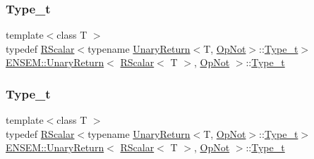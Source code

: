 \subsubsection{\texorpdfstring{Type\_t}{Type\_t}\hspace{0.1cm}{\footnotesize\ttfamily [1/3]}}
{\footnotesize\ttfamily template$<$class T $>$ \\
typedef \mbox{\hyperlink{classENSEM_1_1RScalar}{R\+Scalar}}$<$typename \mbox{\hyperlink{structENSEM_1_1UnaryReturn}{Unary\+Return}}$<$T, \mbox{\hyperlink{structENSEM_1_1OpNot}{Op\+Not}}$>$\+::\mbox{\hyperlink{structENSEM_1_1UnaryReturn_3_01RScalar_3_01T_01_4_00_01OpNot_01_4_af9f59bfbcb4e45c668599e7707d39a0c}{Type\+\_\+t}}$>$ \mbox{\hyperlink{structENSEM_1_1UnaryReturn}{E\+N\+S\+E\+M\+::\+Unary\+Return}}$<$ \mbox{\hyperlink{classENSEM_1_1RScalar}{R\+Scalar}}$<$ T $>$, \mbox{\hyperlink{structENSEM_1_1OpNot}{Op\+Not}} $>$\+::\mbox{\hyperlink{structENSEM_1_1UnaryReturn_3_01RScalar_3_01T_01_4_00_01OpNot_01_4_af9f59bfbcb4e45c668599e7707d39a0c}{Type\+\_\+t}}}

\mbox{\label{structENSEM_1_1UnaryReturn_3_01RScalar_3_01T_01_4_00_01OpNot_01_4_af9f59bfbcb4e45c668599e7707d39a0c}} 
\subsubsection{\texorpdfstring{Type\_t}{Type\_t}\hspace{0.1cm}{\footnotesize\ttfamily [2/3]}}
{\footnotesize\ttfamily template$<$class T $>$ \\
typedef \mbox{\hyperlink{classENSEM_1_1RScalar}{R\+Scalar}}$<$typename \mbox{\hyperlink{structENSEM_1_1UnaryReturn}{Unary\+Return}}$<$T, \mbox{\hyperlink{structENSEM_1_1OpNot}{Op\+Not}}$>$\+::\mbox{\hyperlink{structENSEM_1_1UnaryReturn_3_01RScalar_3_01T_01_4_00_01OpNot_01_4_af9f59bfbcb4e45c668599e7707d39a0c}{Type\+\_\+t}}$>$ \mbox{\hyperlink{structENSEM_1_1UnaryReturn}{E\+N\+S\+E\+M\+::\+Unary\+Return}}$<$ \mbox{\hyperlink{classENSEM_1_1RScalar}{R\+Scalar}}$<$ T $>$, \mbox{\hyperlink{structENSEM_1_1OpNot}{Op\+Not}} $>$\+::\mbox{\hyperlink{structENSEM_1_1UnaryReturn_3_01RScalar_3_01T_01_4_00_01OpNot_01_4_af9f59bfbcb4e45c668599e7707d39a0c}{Type\+\_\+t}}}

